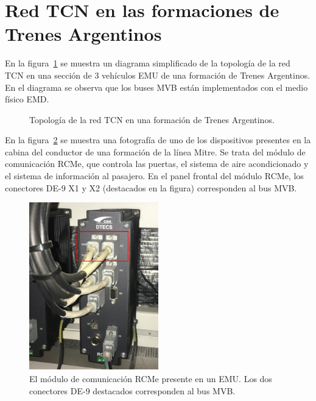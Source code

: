 \section{Red TCN en las formaciones de Trenes Argentinos}

En la figura~\ref{fig:tms} se muestra un diagrama simplificado de la topología de la red TCN en una sección de 3 vehículos EMU de una formación de Trenes Argentinos. En el diagrama se observa que los buses MVB están implementados con el medio físico EMD.

\begin{figure}[htbp]
	\centering
    {
        \fontsize{8pt}{8pt}\selectfont
        
    }
	\caption[Topología de la red TCN en una formación de Trenes Argentinos]{Topología de la red TCN en una formación de Trenes Argentinos.}
    \label{fig:tms}
\end{figure}

\pagebreak

En la figura~\ref{fig:rcme} se muestra una fotografía de uno de los dispositivos presentes en la cabina del conductor de una formación de la línea Mitre. Se trata del módulo de comunicación RCMe, que controla las puertas, el sistema de aire acondicionado y el sistema de información al pasajero. En el panel frontal del módulo RCMe, los conectores DE-9 X1 y X2 (destacados en la figura) corresponden al bus MVB.

\begin{figure}[htbp]
	\centering
	\includegraphics[width=0.5\textwidth]{./Figures/RCMe.pdf}
	\caption[El módulo de comunicación RCMe]{El módulo de comunicación RCMe presente en un EMU. Los dos conectores DE-9 destacados corresponden al bus MVB.}
    \label{fig:rcme}
\end{figure}

